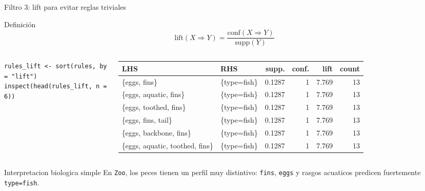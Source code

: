 \documentclass[10pt,aspectratio=169]{beamer}
\begin{document}
\begin{frame}[fragile]{Filtro 3: lift para evitar reglas triviales}
\begin{block}{Definición}
\[
\mathrm{lift}(X \Rightarrow Y) = \frac{\mathrm{conf}(X \Rightarrow Y)}{\mathrm{supp}(Y)}
\]
\end{block}

\begin{columns}[T]
\begin{lstlisting}[style=rcode]
rules_lift <- sort(rules, by = "lift")
inspect(head(rules_lift, n = 6))
\end{lstlisting}

\scriptsize
\begin{tabular}{llrrrr}
\toprule
LHS & RHS & supp. & conf. & lift & count \\
\midrule
\{eggs, fins\} & \{type=fish\} & 0.1287 & 1 & 7.769 & 13 \\
\{eggs, aquatic, fins\} & \{type=fish\} & 0.1287 & 1 & 7.769 & 13 \\
\{eggs, toothed, fins\} & \{type=fish\} & 0.1287 & 1 & 7.769 & 13 \\
\{eggs, fins, tail\} & \{type=fish\} & 0.1287 & 1 & 7.769 & 13 \\
\{eggs, backbone, fins\} & \{type=fish\} & 0.1287 & 1 & 7.769 & 13 \\
\{eggs, aquatic, toothed, fins\} & \{type=fish\} & 0.1287 & 1 & 7.769 & 13 \\
\bottomrule
\end{tabular}
\end{columns}

\begin{block}{Interpretacion biologica simple}
En \texttt{Zoo}, los peces tienen un perfil muy distintivo: \texttt{fins}, \texttt{eggs} y rasgos acuaticos predicen fuertemente \texttt{type=fish}.
\end{block}
\end{frame}
\end{document}
